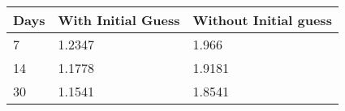 \begin{tabular}{lll}
Days & With Initial Guess & Without Initial guess \\ 
\hline 
7 & 1.2347 & 1.966 \\ 
14 & 1.1778 & 1.9181 \\ 
30 & 1.1541 & 1.8541 \\ 
\hline 
\end{tabular}